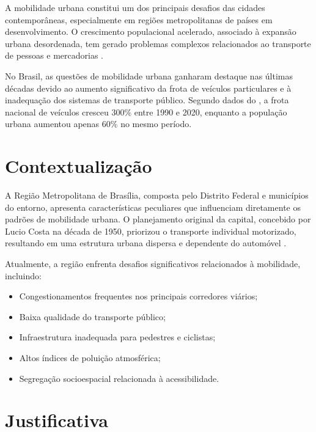 

A mobilidade urbana constitui um dos principais desafios das cidades contemporâneas, especialmente em regiões metropolitanas de países em desenvolvimento. O crescimento populacional acelerado, associado à expansão urbana desordenada, tem gerado problemas complexos relacionados ao transporte de pessoas e mercadorias \cite{vasconcellos2012}.

No Brasil, as questões de mobilidade urbana ganharam destaque nas últimas décadas devido ao aumento significativo da frota de veículos particulares e à inadequação dos sistemas de transporte público. Segundo dados do  \cite{ibge2022}, a frota nacional de veículos cresceu 300\% entre 1990 e 2020, enquanto a população urbana aumentou apenas 60\% no mesmo período.

\section{Contextualização}

A Região Metropolitana de Brasília, composta pelo Distrito Federal e municípios do entorno, apresenta características peculiares que influenciam diretamente os padrões de mobilidade urbana. O planejamento original da capital, concebido por Lucio Costa na década de 1950, priorizou o transporte individual motorizado, resultando em uma estrutura urbana dispersa e dependente do automóvel \cite{costa2018}.

Atualmente, a região enfrenta desafios significativos relacionados à mobilidade, incluindo:

\begin{itemize}
    \item Congestionamentos frequentes nos principais corredores viários;
    \item Baixa qualidade do transporte público;
    \item Infraestrutura inadequada para pedestres e ciclistas;
    \item Altos índices de poluição atmosférica;
    \item Segregação socioespacial relacionada à acessibilidade.
\end{itemize}

\section{Justificativa}

